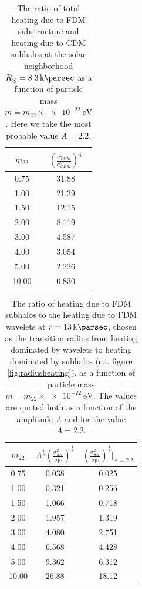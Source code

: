 \documentclass[usenatbib]{mnras}
\begin{document}
\begin{table} 
\begin{center}
 \begin{tabular}{||c c||} 
 \hline
 $m_{22}$ & $\left( \frac{\sigma_{FDM}^2}{\sigma_{CDM}^2} \right)^{\tfrac{1}{2}}$ \\ [2.5ex] 
 \hline\hline
 0.75 & 31.88 \\ 
 \hline
 1.00 & 21.39 \\
 \hline
 1.50 & 12.15 \\
 \hline
 2.00 & 8.119 \\
 \hline
 3.00 & 4.587 \\
 \hline
 4.00 & 3.054 \\
 \hline
 5.00 & 2.226 \\
 \hline
 10.00 & 0.830 \\ [1ex] 
 \hline
\end{tabular}
\end{center}
\caption{The ratio of total heating due to FDM substructure and heating due to CDM subhalos at the solar neighborhood $R_{\odot} = \SI{8.3}{\kilo\parsec}$ as a function of particle mass $m = m_{22} \times \SI{e-22}{\electronvolt}$. Here we take the most probable value $A = 2.2$.}
\label{table:FDM_ratio}
\end{table}

\begin{table} \label{FDM_ratio}
\begin{center}
 \begin{tabular}{||c c c||} 
 \hline
 $m_{22}$ & $A^{\tfrac{1}{2}} \left( \frac{\sigma_{SH}^2}{\sigma_{W}^2} \right)^{\tfrac{1}{2}}$ & $ \left( \frac{\sigma_{SH}^2}{\sigma_{W}^2} \right)^{\tfrac{1}{2}} \bigg|_{A = 2.2}$ \\ [2.5ex] 
 \hline\hline
 0.75 & 0.038 & 0.025 \\ 
 \hline
 1.00 & 0.321 &  0.256 \\
 \hline
 1.50 & 1.066 &  0.718 \\
 \hline
 2.00 & 1.957 &  1.319 \\
 \hline
 3.00 & 4.080 & 2.751 \\
 \hline
 4.00 & 6.568 & 4.428 \\
 \hline
 5.00 & 9.362 &  6.312 \\
 \hline
 10.00 & 26.88 & 18.12 \\ [1ex] 
 \hline
\end{tabular}
\end{center}
\caption{The ratio of heating due to FDM subhalos to the heating due to FDM wavelets at $r = \SI{13}{\kilo\parsec}$, chosen as the transition radius from heating dominated by wavelets to heating dominated by subhalos (c.f. figure \ref{fig:radiusheating}), as a function of particle mass $m = m_{22} \times \SI{e-22}{\electronvolt}$. The values are quoted both as a function of the amplitude $A$ and for the value $A = 2.2$. }
\end{table}
\end{document}
